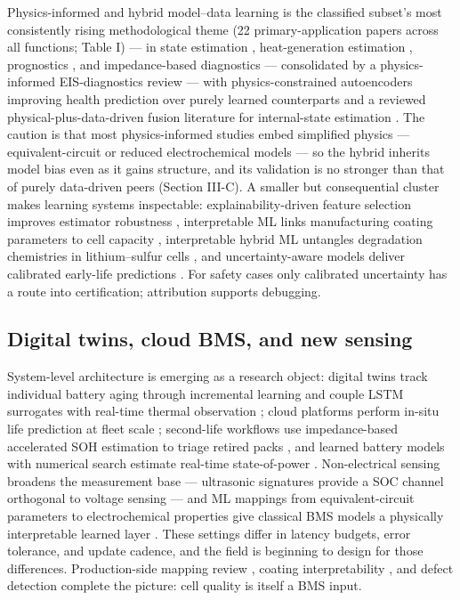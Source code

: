 \documentclass[journal]{IEEEtran}
\begin{document}
Physics-informed and hybrid model--data learning is the classified subset's most consistently rising methodological theme (22 primary-application papers across all functions; Table I) --- in state estimation \cite{r10}\cite{r91}, heat-generation estimation \cite{r9}, prognostics \cite{r60}, and impedance-based diagnostics --- consolidated by a physics-informed EIS-diagnostics review \cite{r21} --- with physics-constrained autoencoders improving health prediction over purely learned counterparts \cite{r92} and a reviewed physical-plus-data-driven fusion literature for internal-state estimation \cite{r93}. The caution is that most physics-informed studies embed simplified physics --- equivalent-circuit or reduced electrochemical models --- so the hybrid inherits model bias even as it gains structure, and its validation is no stronger than that of purely data-driven peers (Section III-C). A smaller but consequential cluster makes learning systems inspectable: explainability-driven feature selection improves estimator robustness \cite{r94}, interpretable ML links manufacturing coating parameters to cell capacity \cite{r95}, interpretable hybrid ML untangles degradation chemistries in lithium--sulfur cells \cite{r96}, and uncertainty-aware models deliver calibrated early-life predictions \cite{r77}. For safety cases only calibrated uncertainty has a route into certification; attribution supports debugging.

\subsection{Digital twins, cloud BMS, and new sensing}

System-level architecture is emerging as a research object: digital twins track individual battery aging through incremental learning \cite{r97} and couple LSTM surrogates with real-time thermal observation \cite{r98}; cloud platforms perform in-situ life prediction at fleet scale \cite{r99}; second-life workflows use impedance-based accelerated SOH estimation to triage retired packs \cite{r100}, and learned battery models with numerical search estimate real-time state-of-power \cite{r101}. Non-electrical sensing broadens the measurement base --- ultrasonic signatures provide a SOC channel orthogonal to voltage sensing \cite{r102} --- and ML mappings from equivalent-circuit parameters to electrochemical properties give classical BMS models a physically interpretable learned layer \cite{r103}. These settings differ in latency budgets, error tolerance, and update cadence, and the field is beginning to design for those differences. Production-side mapping review \cite{r104}, coating interpretability \cite{r95}, and defect detection \cite{r89} complete the picture: cell quality is itself a BMS input.
\end{document}
